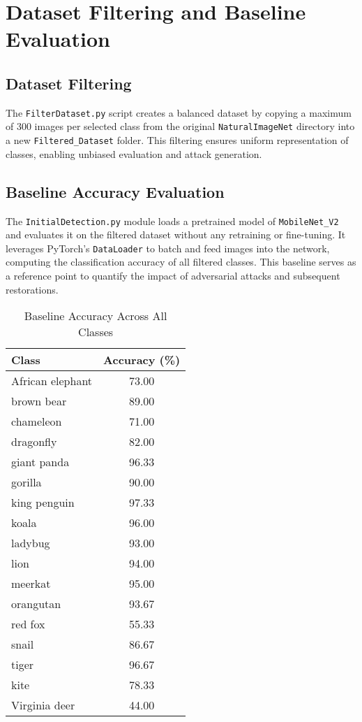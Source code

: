 \documentclass[a4paper,12pt]{report}%
\begin{document}
\newpage

\chapter{Dataset Filtering and Baseline Evaluation}
\section{Dataset Filtering}
The \texttt{FilterDataset.py} script creates a balanced dataset by copying a maximum of 300 images per selected class from the original \texttt{NaturalImageNet} directory into a new \texttt{Filtered\_Dataset} folder. This filtering ensures uniform representation of classes, enabling unbiased evaluation and attack generation.

\section{Baseline Accuracy Evaluation}
The \texttt{InitialDetection.py} module loads a pretrained model of \texttt{MobileNet\_V2} and evaluates it on the filtered dataset without any retraining or fine-tuning. It leverages PyTorch's \texttt{DataLoader} to batch and feed images into the network, computing the classification accuracy of all filtered classes. This baseline serves as a reference point to quantify the impact of adversarial attacks and subsequent restorations.

\begin{table}[H]
\centering
\caption{Baseline Accuracy Across All Classes}
\begin{tabular}{|l|c|}
\hline
\textbf{Class} & \textbf{Accuracy (\%)} \\
\hline
African elephant & 73.00 \\
brown bear & 89.00 \\
chameleon & 71.00 \\
dragonfly & 82.00 \\
giant panda & 96.33 \\
gorilla & 90.00 \\
king penguin & 97.33 \\
koala & 96.00 \\
ladybug & 93.00 \\
lion & 94.00 \\
meerkat & 95.00 \\
orangutan & 93.67 \\
red fox & 55.33 \\
snail & 86.67 \\
tiger & 96.67 \\
kite & 78.33 \\
Virginia deer & 44.00 \\
\hline
\end{tabular}
\end{table}
\end{document}
